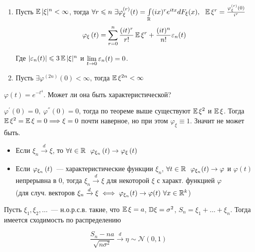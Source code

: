 \begin{theorem}
\hfill \break
\begin{enumerate}
    \item Пусть $\operatorname{\mathbb{E}}|\xi|^n < \infty$, тогда $\forall r \leqslant n \ \exists \varphi^{(r)}_\xi(t) = \int\limits_{\R} (ix)^r e^{itx} dF_\xi(x), \ \ \E\xi^r = \frac{\varphi^{(r)}_\xi(0)}{i^r}$
    $$
    \varphi_{\xi}\left({t}\right) = \sum\limits_{r = 0}^n \frac{(it)^r}{r!}\operatorname{\mathbb{E}}\xi^r + \frac{(it)^n}{n!}\varepsilon_n(t)
    $$
    
    Где $|\varepsilon_n(t)| \leqslant 3\operatorname{\mathbb{E}}|\xi|^n$ и $\lim\limits_{t \to 0}\varepsilon_n(t) = 0$.
    
    \item Пусть  $\exists \varphi^{(2n)}(0) < \infty$, тогда $\operatorname{\mathbb{E}}\xi^{2n} < \infty$ 
\end{enumerate}

\end{theorem}

\Example $\varphi(t) = e^{-t^4}$. Может ли она быть характеристической?

\Solution $\varphi^{'}(0) = 0, \ \varphi^{''}(0) = 0$, тогда по теореме выше существуют $\operatorname{\mathbb{E}}\xi^2$ и $\operatorname{\mathbb{E}}\xi$. Тогда $\operatorname{\mathbb{E}}\xi^2 = \operatorname{\mathbb{E}}\xi = 0 \Longrightarrow \xi = 0$ почти наверное, но при этом $\varphi_{\xi} \equiv 1$. Значит не может быть.

\begin{theorem}[О непрерывности (б/д)]
\hfill \break
\begin{itemize}
    \item Если $\xi_n \xrightarrow[]{d}  \xi$, то $\forall t \in \mathbb{R} \ \ \varphi_{\xi_n}\left({t}\right) \to \varphi_{\xi}\left({t}\right)$
    \item Если $\varphi_{\xi_n}\left({t}\right)$~--- характеристические функции $\xi_n$, $\forall t \in \mathbb{R} \ \  \varphi_{\xi_n}(t) \to \varphi$ и $\varphi(t)$ непрерывна в 0, тогда $\xi_n \xrightarrow[]{d}  \xi$ для некоторой $\xi$ с характ. функцией $\varphi$  \\ (для случ. векторов $\xi_n \xrightarrow[]{d}  \xi \iff \varphi_{\xi_n}(t) \to \varphi(t) \ \forall x \in \mathbb{R}^k$)
\end{itemize}

\end{theorem}

\begin{theorem} 
Пусть $\xi_1, \xi_2, \ldots$~--- н.о.р.с.в. такие, что $\operatorname{\mathbb{E}}\xi = a$, ${\mathbb{D}}\xi = \sigma^2$,  $S_n = \xi_1 + \ldots + \xi_n$. Тогда имеется сходимость по распределению

$$
\frac{S_n - na}{\sqrt{n\sigma^2}} \xrightarrow[]{d} \eta \sim \mathcal{N}(0, 1)
$$

\end{theorem}

